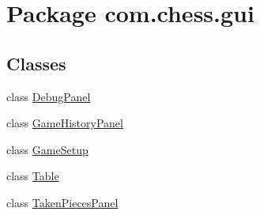 \hypertarget{namespacecom_1_1chess_1_1gui}{}\section{Package com.\+chess.\+gui}
\label{namespacecom_1_1chess_1_1gui}
\subsection*{Classes}
\begin{DoxyCompactItemize}
\item 
class \mbox{\hyperlink{classcom_1_1chess_1_1gui_1_1_debug_panel}{Debug\+Panel}}
\item 
class \mbox{\hyperlink{classcom_1_1chess_1_1gui_1_1_game_history_panel}{Game\+History\+Panel}}
\item 
class \mbox{\hyperlink{classcom_1_1chess_1_1gui_1_1_game_setup}{Game\+Setup}}
\item 
class \mbox{\hyperlink{classcom_1_1chess_1_1gui_1_1_table}{Table}}
\item 
class \mbox{\hyperlink{classcom_1_1chess_1_1gui_1_1_taken_pieces_panel}{Taken\+Pieces\+Panel}}
\end{DoxyCompactItemize}
